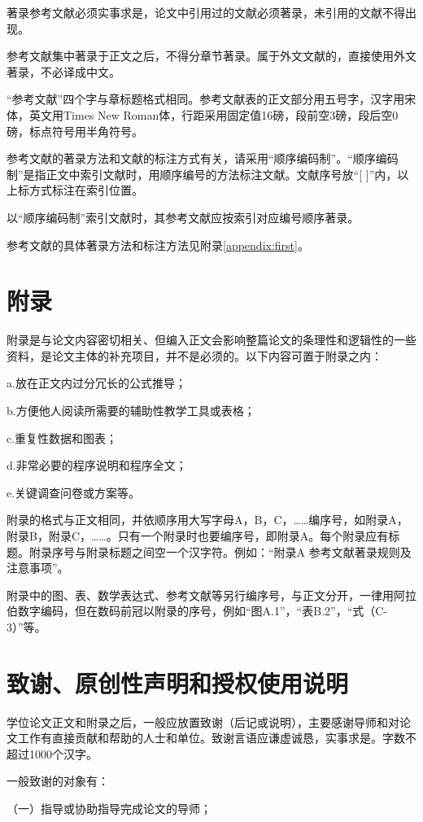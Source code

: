 著录参考文献必须实事求是，论文中引用过的文献必须著录，未引用的文献不得出现。

参考文献集中著录于正文之后，不得分章节著录。属于外文文献的，直接使用外文著录，不必译成中文。

“参考文献”四个字与章标题格式相同。参考文献表的正文部分用五号字，汉字用宋体，英文用Times New Roman体，行距采用固定值16磅，段前空3磅，段后空0 磅，标点符号用半角符号。

参考文献的著录方法和文献的标注方式有关，请采用“顺序编码制”。“顺序编码制”是指正文中索引文献时，用顺序编号的方法标注文献。文献序号放“[ ]”内，以上标方式标注在索引位置。

以“顺序编码制”索引文献时，其参考文献应按索引对应编号顺序著录。

参考文献的具体著录方法和标注方法见附录\ref{appendix:first}。

\section{附录}
附录是与论文内容密切相关、但编入正文会影响整篇论文的条理性和逻辑性的一些资料，是论文主体的补充项目，并不是必须的。以下内容可置于附录之内：

a.放在正文内过分冗长的公式推导；

b.方便他人阅读所需要的辅助性教学工具或表格；

c.重复性数据和图表；

d.非常必要的程序说明和程序全文；

e.关键调查问卷或方案等。

附录的格式与正文相同，并依顺序用大写字母A，B，C，……编序号，如附录A，附录B，附录C，……。只有一个附录时也要编序号，即附录A。每个附录应有标题。附录序号与附录标题之间空一个汉字符。例如：“附录A  参考文献著录规则及注意事项”。

附录中的图、表、数学表达式、参考文献等另行编序号，与正文分开，一律用阿拉伯数字编码，但在数码前冠以附录的序号，例如“图A.1”，“表B.2”，“式（C-3）”等。

\section{致谢、原创性声明和授权使用说明}

学位论文正文和附录之后，一般应放置致谢（后记或说明），主要感谢导师和对论文工作有直接贡献和帮助的人士和单位。致谢言语应谦虚诚恳，实事求是。字数不超过1000个汉字。

一般致谢的对象有：

（一）指导或协助指导完成论文的导师；

